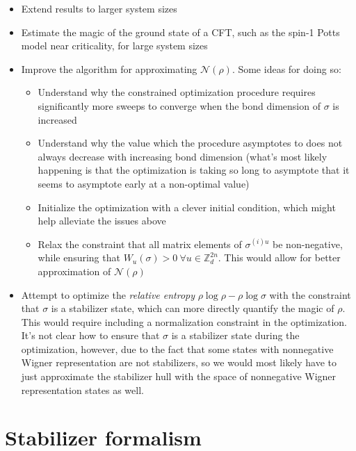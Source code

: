 \documentclass{article}
\begin{document}
\begin{itemize}
\item Extend results to larger system sizes
\item Estimate the magic of the ground state of a CFT, such as the spin-1 Potts model near criticality, for large system sizes
\item Improve the algorithm for approximating $\mathcal N(\rho)$. Some ideas for doing so:
	\begin{itemize}
	\item Understand why the constrained optimization procedure requires significantly more sweeps to converge when the bond dimension of $\sigma$ is increased
	\item Understand why the value which the procedure asymptotes to does not always decrease with increasing bond dimension (what's most likely happening is that the optimization is taking so long to asymptote that it seems to asymptote early at a non-optimal value)
	\item Initialize the optimization with a clever initial condition, which might help alleviate the issues above
	\item Relax the constraint that all matrix elements of $\sigma^{(i)u}$ be non-negative, while ensuring that $W_u(\sigma)>0\ \forall u\in \mathbb Z_d^{2n}$. This would allow for better approximation of $\mathcal N(\rho)$
	\end{itemize}
\item Attempt to optimize the \textit{relative entropy} \cite{Veitch_2014} $\rho \log \rho - \rho \log \sigma$ with the constraint that $\sigma$ is a stabilizer state, which can more directly quantify the magic of $\rho$. This would require including a normalization constraint in the optimization. It's not clear how to ensure that $\sigma$ is a stabilizer state during the optimization, however, due to the fact that some states with nonnegative Wigner representation are not stabilizers, so we would most likely have to just approximate the stabilizer hull with the space of nonnegative Wigner representation states as well. 
\end{itemize}



\pagebreak

\appendix

\section{Stabilizer formalism}
\end{document}
